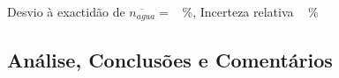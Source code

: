 \documentclass[a4paper,12pt]{article}  %
\begin{document}
\noindent Desvio à exactidão de $\overline{n_{agua}} =$~\underline{\makebox[1cm][r]{~}} \%, 
 Incerteza relativa ~\underline{\makebox[1cm][r]{~}} \%




\subsection{\sf Análise, Conclusões e Comentários}
\noindent\underline{\makebox[\textwidth][r]{~}} \\
\noindent\underline{\makebox[\textwidth][r]{~}} \\
\noindent\underline{\makebox[\textwidth][r]{~}} \\
\noindent\underline{\makebox[\textwidth][r]{~}} \\
\noindent\underline{\makebox[\textwidth][r]{~}} \\
\noindent\underline{\makebox[\textwidth][r]{~}} \\
\noindent\underline{\makebox[\textwidth][r]{~}} \\
\noindent\underline{\makebox[\textwidth][r]{~}} \\
\noindent\underline{\makebox[\textwidth][r]{~}} \\
\noindent\underline{\makebox[\textwidth][r]{~}} \\
\noindent\underline{\makebox[\textwidth][r]{~}} \\
\noindent\underline{\makebox[\textwidth][r]{~}} \\
\noindent\underline{\makebox[\textwidth][r]{~}} \\
\noindent\underline{\makebox[\textwidth][r]{~}} \\
\noindent\underline{\makebox[\textwidth][r]{~}} \\




\end{document}
